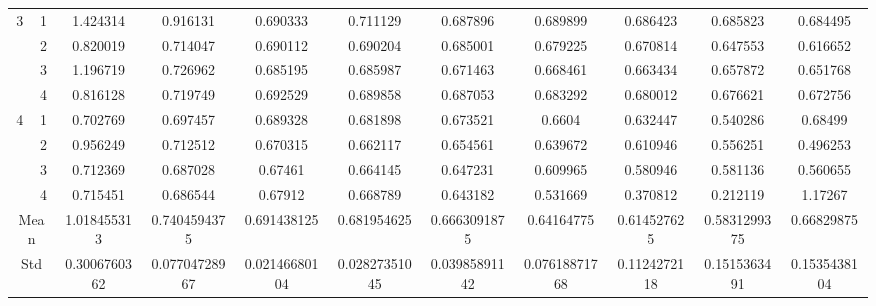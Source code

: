 \documentclass[draft,dvipsnames]{drexel-thesis}
\begin{document}
\begin{thesis}
\begin{table}[!t]
{\begin{tabular}{|c|c|c|c|c|c|c|c|c|c|c|}
\multirow{4}{*}{3}    & 1                   & 1.424314     & 0.916131      & 0.690333      & 0.711129      & 0.687896      & 0.689899      & 0.686423     & 0.685823     & 0.684495     \\ \cline{2-11}
                      & 2                   & 0.820019     & 0.714047      & 0.690112      & 0.690204      & 0.685001      & 0.679225      & 0.670814     & 0.647553     & 0.616652     \\ \cline{2-11}
                      & 3                   & 1.196719     & 0.726962      & 0.685195      & 0.685987      & 0.671463      & 0.668461      & 0.663434     & 0.657872     & 0.651768     \\ \cline{2-11}
                      & 4                   & 0.816128     & 0.719749      & 0.692529      & 0.689858      & 0.687053      & 0.683292      & 0.680012     & 0.676621     & 0.672756     \\ \hline
\multirow{4}{*}{4}    & 1                   & 0.702769     & 0.697457      & 0.689328      & 0.681898      & 0.673521      & 0.6604        & 0.632447     & 0.540286     & 0.68499      \\ \cline{2-11}
                      & 2                   & 0.956249     & 0.712512      & 0.670315      & 0.662117      & 0.654561      & 0.639672      & 0.610946     & 0.556251     & 0.496253     \\ \cline{2-11}
                      & 3                   & 0.712369     & 0.687028      & 0.67461       & 0.664145      & 0.647231      & 0.609965      & 0.580946     & 0.581136     & 0.560655     \\ \cline{2-11}
                      & 4                   & 0.715451     & 0.686544      & 0.67912       & 0.668789      & 0.643182      & 0.531669      & 0.370812     & 0.212119     & 1.17267      \\ \hline
\multicolumn{2}{|c|}{Mean}                  & 1.018455313  & 0.7404594375  & 0.691438125   & 0.681954625   & 0.6663091875  & 0.64164775    & 0.614527625  & 0.5831299375 & 0.66829875   \\ \hline
\multicolumn{2}{|c|}{Std}                   & 0.3006760362 & 0.07704728967 & 0.02146680104 & 0.02827351045 & 0.03985891142 & 0.07618871768 & 0.1124272118 & 0.1515363491 & 0.1535438104 \\ \hline
\end{tabular}}
\end{table}


\end{thesis}
\end{document}
